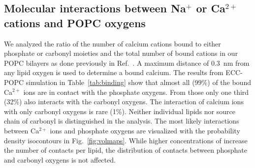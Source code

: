 \documentclass[aip,jcp,twocolumn]{revtex4}
\begin{document}
\subsection{Molecular interactions between Na$^+$ or Ca$^{2+}$ cations and POPC oxygens}
We analyzed the ratio of the number of calcium cations bound to either phosphate or carbonyl moieties and the total number of bound cations in our POPC bilayers as done previously in Ref.~. A maximum distance of 0.3~nm from any lipid oxygen is used to determine a bound calcium. The results from ECC-POPC simulation in Table~\ref{tab:binding} show that almost all (99\%) of the bound Ca$^{2+}$ ions are in contact with the phosphate oxygens. From those only one third (32\%) also interacts with the carbonyl oxygens. The interaction of calcium ions with only carbonyl oxygens is rare (1\%). Neither individual lipids nor source chain of carbonyl is distinguished in the analysis. The most likely interactions between Ca$^{2+}$ ions and phosphate oxygens are visualized with the probability density isocontours in Fig.~\ref{fig:volmaps}. While higher concentrations of  increase the number of contacts per lipid, the distribution of contacts between phosphate and carbonyl oxygens is not affected.
\end{document}
